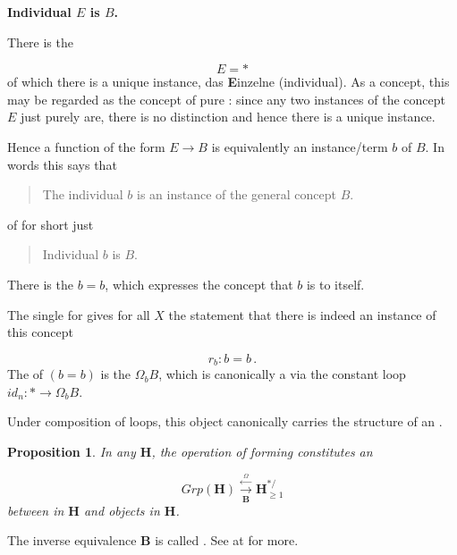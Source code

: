 \documentclass[12pt,titlepage]{article}
\theoremstyle{plain}
\newtheorem{prop}{Proposition}
\theoremstyle{definition}
\theoremstyle{remark}
\begin{document}
\textbf{Individual $E$ is $B$.}

There is the 

\begin{displaymath}
E = \ast
\end{displaymath}
of which there is a unique instance, das \textbf{E}inzelne (individual). As a concept, this may be regarded as the concept of pure : since any two instances of the concept $E$ just purely are, there is no distinction and hence there is a unique instance.

Hence a function of the form $E \longrightarrow B$ is equivalently an instance/term $b$ of $B$. In words this says that

\begin{quote}%
The individual $b$ is an instance of the general concept $B$.


\end{quote}
of for short just

\begin{quote}%
Individual $b$ is $B$.


\end{quote}
There is the  $b = b$, which expresses the concept that $b$ is  to itself.

The single  for  gives for all $X$ the statement that there is indeed an instance of this concept

\begin{displaymath}
r_b \colon b = b
  \,.
\end{displaymath}
The  of $(b = b)$ is the  $\Omega_b B$, which is canonically a  via the constant loop $id_n \colon \ast \to \Omega_b B$.

Under composition of loops, this object canonically carries the structure of an .

\begin{prop}
\label{LoopingDeloopingTheorem}\hypertarget{LoopingDeloopingTheorem}{}
In any  $\mathbf{H}$, the operation of forming  constitutes an 

\begin{displaymath}
Grp(\mathbf{H})
   \stackrel{\overset{\Omega}{\longleftarrow}}{\underset{\mathbf{B}}{\longrightarrow}}
  \mathbf{H}^{\ast/}_{\geq 1}
\end{displaymath}
between  in $\mathbf{H}$ and   objects in $\mathbf{H}$.

\end{prop}
The inverse equivalence $\mathbf{B}$ is called . See at  for more.
\end{document}
